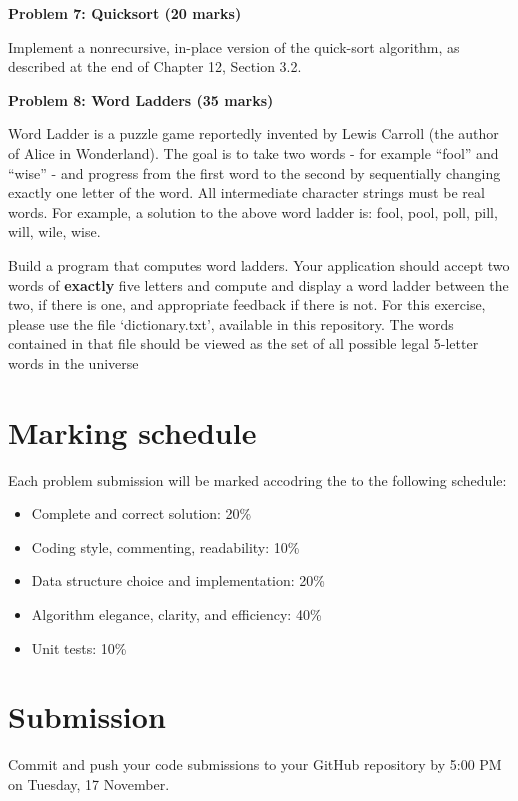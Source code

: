 \documentclass{article}
\begin{document}
\textbf{Problem 7: Quicksort (20 marks)}

Implement a nonrecursive, in-place version of the quick-sort algorithm, as
described at the end of Chapter 12, Section 3.2.

\textbf{Problem 8: Word Ladders (35 marks)}

Word Ladder is a puzzle game reportedly invented by Lewis Carroll (the author of Alice in
Wonderland). The goal is to take two words - for example ``fool'' and ``wise'' - and progress from the
first word to the second by sequentially changing exactly one letter of the word. All intermediate
character strings must be real words. For example, a solution to the above word ladder is: fool, pool,
poll, pill, will, wile, wise.

Build a program that computes word ladders. Your application should accept two words of \textbf{exactly}
five letters and compute and display a word ladder between the two, if there is one, and
appropriate feedback if there is not. For this exercise, please use the file ‘dictionary.txt’, available in this repository.
 The words contained in that file should be viewed as the set of all possible legal 5-letter
words in the universe 


\section{Marking schedule}

Each problem submission will be marked accodring the to the following schedule:

\begin{itemize}
	\item Complete and correct solution: 20\%
	\item Coding style, commenting, readability: 10\% 
	\item Data structure choice and implementation: 20\%
	\item Algorithm elegance, clarity, and efficiency: 40\%
	\item Unit tests: 10\%
\end{itemize}


\section{Submission}
Commit and push your code submissions to your GitHub repository by 5:00 PM on Tuesday, 17 November.
\end{document}

